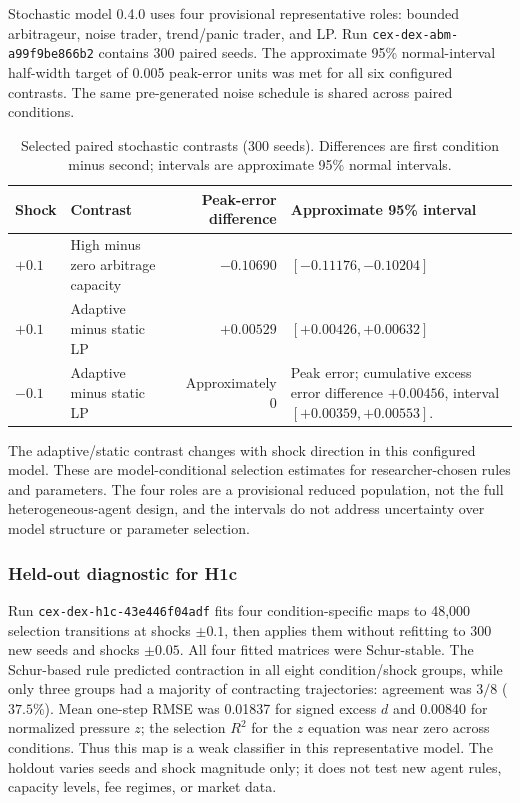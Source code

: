Stochastic model 0.4.0 uses four provisional representative roles: bounded
arbitrageur, noise trader, trend/panic trader, and LP. Run
\texttt{cex-dex-abm-a99f9be866b2} contains 300 paired seeds. The approximate 95\%
normal-interval half-width target of 0.005 peak-error units was met for all six
configured contrasts. The same pre-generated noise schedule is shared across paired
conditions.

\begin{table}[!ht]
\centering
\scriptsize
\caption{Selected paired stochastic contrasts (300 seeds). Differences are first
condition minus second; intervals are approximate 95\% normal intervals.}
\begin{tabularx}{\textwidth}{@{}>{\raggedright\arraybackslash}p{3.3cm} >{\raggedright\arraybackslash}p{3cm} r X@{}}
\toprule
\textbf{Shock} & \textbf{Contrast} & \textbf{Peak-error difference} &
\textbf{Approximate 95\% interval} \\
\midrule
$+0.1$ & High minus zero arbitrage capacity & $-0.10690$ & $[-0.11176,-0.10204]$ \\
$+0.1$ & Adaptive minus static LP & $+0.00529$ & $[+0.00426,+0.00632]$ \\
$-0.1$ & Adaptive minus static LP & Approximately $0$ & Peak error; cumulative excess
  error difference $+0.00456$, interval $[+0.00359,+0.00553]$. \\
\bottomrule
\end{tabularx}
\end{table}

The adaptive/static contrast changes with shock direction in this configured model.
These are model-conditional selection estimates for researcher-chosen rules and
parameters. The four roles are a provisional reduced population, not the full
heterogeneous-agent design, and the intervals do not address uncertainty over model
structure or parameter selection.

\subsubsection{Held-out diagnostic for H1c}

Run \texttt{cex-dex-h1c-43e446f04adf} fits four condition-specific maps to 48,000
selection transitions at shocks $\pm0.1$, then applies them without refitting to 300
new seeds and shocks $\pm0.05$. All four fitted matrices were Schur-stable. The
Schur-based rule predicted contraction in all eight condition/shock groups, while
only three groups had a majority of contracting trajectories: agreement was $3/8$
($37.5\%$). Mean one-step RMSE was 0.01837 for signed excess $d$ and 0.00840 for
normalized pressure $z$; the selection $R^2$ for the $z$ equation was near zero across
conditions. Thus this map is a weak classifier in this representative model. The
holdout varies seeds and shock magnitude only; it does not test new agent rules,
capacity levels, fee regimes, or market data.

